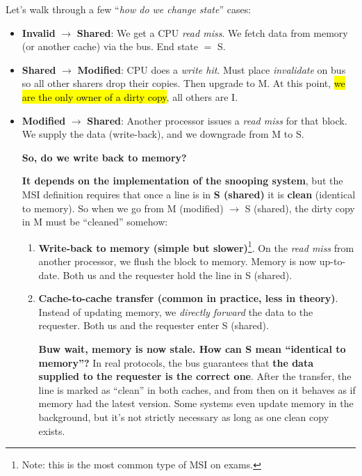 \begin{examplebox}[: Transitions]
    Let's walk through a few ``\emph{how do we change state}'' cases:
    \begin{itemize}
        \item \textbf{Invalid} $\to$ \textbf{Shared}: We get a CPU \emph{read miss}. We fetch data from memory (or another cache) via the bus. End state $=$ S.
        \item \textbf{Shared} $\to$ \textbf{Modified}: CPU does a \emph{write hit}. Must place \emph{invalidate} on bus so all other sharers drop their copies. Then upgrade to M. At this point, \hl{we are the only owner of a dirty copy}, all others are I.
        \item \textbf{Modified} $\to$ \textbf{Shared}: Another processor issues a \emph{read miss} for that block. We supply the data (write-back), and we downgrade from M to S.
        \begin{flushleft}
            \textcolor{Green3}{ \textbf{So, do we write back to memory?}}
        \end{flushleft}
        \textbf{It depends on the implementation of the snooping system}, but the MSI definition requires that once a line is in \textbf{S (shared)} it is \textbf{clean} (identical to memory). So when we go from M (modified) $\to$ S (shared), the dirty copy in M must be ``cleaned'' somehow:
        \begin{enumerate}
            \item \textbf{Write-back to memory (simple but slower)}\footnote{Note: this is the most common type of MSI on exams.}. On the \emph{read miss} from another processor, we flush the block to memory. Memory is now up-to-date. Both us and the requester hold the line in S (shared).
            \item \textbf{Cache-to-cache transfer (common in practice, less in theory)}. Instead of updating memory, we \emph{directly forward} the data to the requester. Both us and the requester enter S (shared).

            \textcolor{Green3}{ \textbf{Buw wait, memory is now stale. How can S mean ``identical to memory''?}} In real protocols, the bus guarantees that \textbf{the data supplied to the requester is the correct one}. After the transfer, the line is marked as ``clean'' in both caches, and from then on it behaves as if memory had the latest version. Some systems even update memory in the background, but it's not strictly necessary as long as one clean copy exists.


\end{enumerate}
\end{itemize}
\end{examplebox}
